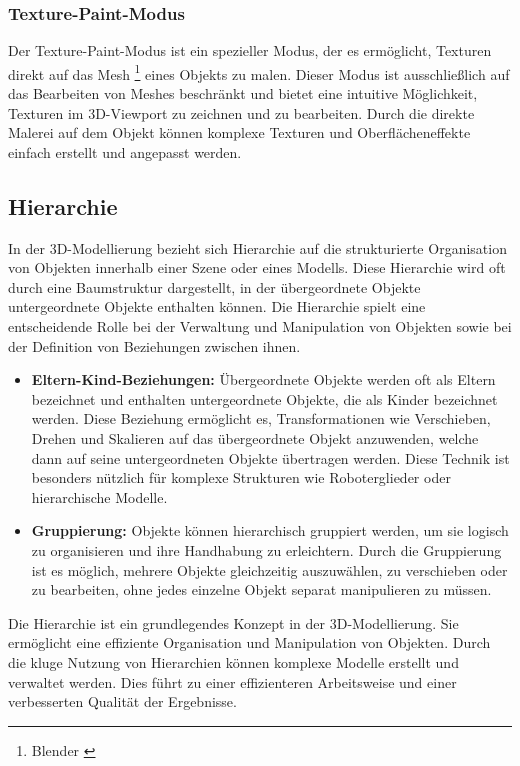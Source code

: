 \subsubsection{Texture-Paint-Modus}
Der Texture-Paint-Modus ist ein spezieller Modus, der es ermöglicht, Texturen direkt auf das Mesh
\footnote{Blender \cite{Mesh}} eines Objekts zu malen. Dieser Modus ist ausschließlich auf das Bearbeiten von Meshes
beschränkt und bietet eine intuitive Möglichkeit, Texturen im 3D-Viewport zu zeichnen und zu bearbeiten. Durch die
direkte Malerei auf dem Objekt können komplexe Texturen und Oberflächeneffekte einfach erstellt und angepasst werden.

\subsection{Hierarchie}
In der 3D-Modellierung bezieht sich Hierarchie auf die strukturierte Organisation von Objekten innerhalb einer Szene
oder eines Modells. Diese Hierarchie wird oft durch eine Baumstruktur dargestellt, in der übergeordnete Objekte
untergeordnete Objekte enthalten können. Die Hierarchie spielt eine entscheidende Rolle bei der Verwaltung und
Manipulation von Objekten sowie bei der Definition von Beziehungen zwischen ihnen.

\begin{itemize}
    \item \textbf{Eltern-Kind-Beziehungen:} Übergeordnete Objekte werden oft als Eltern bezeichnet und enthalten
    untergeordnete Objekte, die als Kinder bezeichnet werden. Diese Beziehung ermöglicht es, Transformationen wie
    Verschieben, Drehen und Skalieren auf das übergeordnete Objekt anzuwenden, welche dann auf seine untergeordneten
    Objekte übertragen werden. Diese Technik ist besonders nützlich für komplexe Strukturen wie Roboterglieder oder
    hierarchische Modelle.
    \item \textbf{Gruppierung:} Objekte können hierarchisch gruppiert werden, um sie logisch zu organisieren und ihre
    Handhabung zu erleichtern. Durch die Gruppierung ist es möglich, mehrere Objekte gleichzeitig auszuwählen, zu
    verschieben oder zu bearbeiten, ohne jedes einzelne Objekt separat manipulieren zu müssen.
\end{itemize}
Die Hierarchie ist ein grundlegendes Konzept in der 3D-Modellierung. Sie ermöglicht eine effiziente Organisation und
Manipulation von Objekten. Durch die kluge Nutzung von Hierarchien können komplexe Modelle erstellt und verwaltet werden.
Dies führt zu einer effizienteren Arbeitsweise und einer verbesserten Qualität der Ergebnisse.

